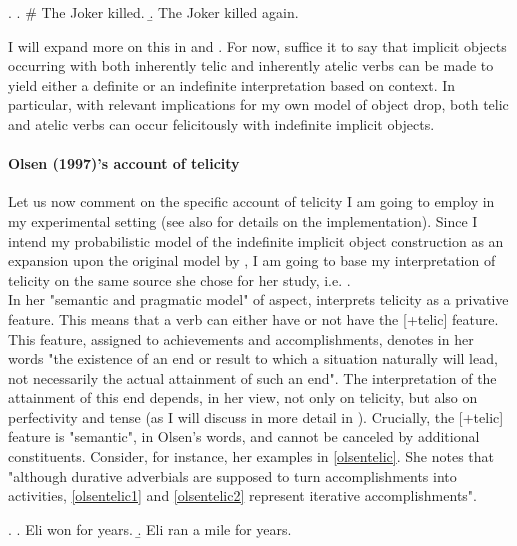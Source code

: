 \ex. \label{goldbergtelic} \a. \label{goldbergtelic1} \# The Joker killed.
\b. \label{goldbergtelic2} The Joker killed again.

I will expand more on this in  and . For now, suffice it to say that implicit objects occurring with both inherently telic and inherently atelic verbs can be made to yield either a definite or an indefinite interpretation based on context. In particular, with relevant implications for my own model of object drop, both telic and atelic verbs can occur felicitously with indefinite implicit objects.

\paragraph{Olsen (1997)'s account of telicity}
Let us now comment on the specific account of telicity I am going to employ in my experimental setting (see also  for details on the implementation). Since I intend my probabilistic model of the indefinite implicit object construction as an expansion upon the original model by \textcite{Medina2007}, I am going to base my interpretation of telicity on the same source she chose for her study, i.e. \textcite{Olsen1997}.\\
In her "semantic and pragmatic model" of aspect, \textcite{Olsen1997} interprets telicity as a privative feature. This means that a verb can either have or not have the [+telic] feature. This feature, assigned to achievements and accomplishments, denotes in her words "the existence of an end or result to which a situation naturally will lead, not necessarily the actual attainment of such an end". The interpretation of the attainment of this end depends, in her view, not only on telicity, but also on perfectivity and tense (as I will discuss in more detail in ). Crucially, the [+telic] feature is "semantic", in Olsen's words, and cannot be canceled by additional constituents. Consider, for instance, her examples in \ref{olsentelic}. She notes that "although durative adverbials are supposed to turn accomplishments into activities, \ref{olsentelic1} and \ref{olsentelic2} represent iterative accomplishments".

\ex. \label{olsentelic} \a. \label{olsentelic1} Eli won for years.
\b. \label{olsentelic2} Eli ran a mile for years.


